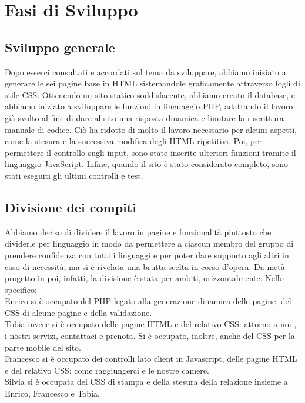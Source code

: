 \section{Fasi di Sviluppo}
\subsection{Sviluppo generale}
Dopo esserci consultati e accordati sul tema da sviluppare, abbiamo iniziato a generare le sei pagine base in HTML sistemandole graficamente attraverso fogli di stile CSS. Ottenendo un sito statico soddisfacente, abbiamo creato il database, e abbiamo iniziato a sviluppare le funzioni in linguaggio PHP, adattando il lavoro già svolto al fine di dare al sito una risposta dinamica e limitare la riscrittura manuale di codice. Ciò ha ridotto di molto il lavoro necessario per alcuni aspetti, come la stesura e la successiva modifica degli HTML ripetitivi. Poi, per permettere il controllo sugli input, sono state inserite ulteriori funzioni tramite il linguaggio JavaScript. Infine, quando il sito è stato considerato completo, sono stati eseguiti gli ultimi controlli e test.
\subsection{Divisione dei compiti}
Abbiamo deciso di dividere il lavoro in pagine e funzionalità piuttosto che dividerle per linguaggio in modo da permettere a ciascun membro del gruppo di prendere confidenza con tutti i linguaggi e per poter dare supporto agli altri in caso di necessità, ma si è rivelata una brutta scelta in corso d’opera. Da metà progetto in poi, infatti, la divisione è stata per ambiti, orizzontalmente. 
Nello specifico:\\

Enrico si è occupato del PHP legato alla generazione dinamica delle pagine, del CSS di alcune pagine e della validazione.\\

Tobia invece si è occupato delle pagine HTML e del relativo CSS: attorno a noi , i nostri servizi, contattaci e prenota. Si è occupato, inoltre, anche del CSS per la parte mobile del sito.\\

Francesco si è occupato dei controlli lato client in Javascript, delle pagine HTML e del relativo CSS: come raggiungerci e le nostre camere.\\

Silvia si è occupata del CSS di stampa e della stesura della relazione insieme a Enrico, Francesco e Tobia. 